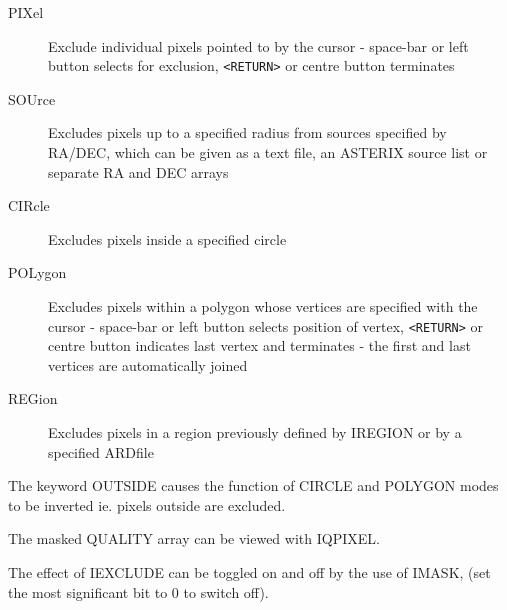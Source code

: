 \documentclass{book}
\renewcommand{\_}{{\tt\char'137}}     %
\begin{document}
\begin{description}
\item[PIXel]
Exclude individual pixels pointed to by the
cursor - space-bar or left button selects
for exclusion, \verb+<RETURN>+ or centre button
terminates
\item[SOUrce]
Excludes pixels up to a specified radius from
sources specified by RA/DEC, which can be given
as a text file, an ASTERIX source list or separate
RA and DEC arrays
\item[CIRcle]
Excludes pixels inside a specified circle
\item[POLygon]
Excludes pixels within a polygon whose vertices
are specified with the cursor - space-bar or
left button selects position of vertex, \verb+<RETURN>+
or centre button indicates last vertex and
terminates - the first and last vertices are
automatically joined
\item[REGion]
Excludes pixels in a region previously defined
by IREGION or by a specified ARDfile
\end{description}
The keyword OUTSIDE causes the function of CIRCLE and POLYGON modes
to be inverted ie. pixels outside are excluded.

The masked QUALITY array can be viewed with IQPIXEL.

The effect of IEXCLUDE can be toggled on and off by the use of
IMASK, (set the most significant bit to 0 to switch off).
\end{document}
